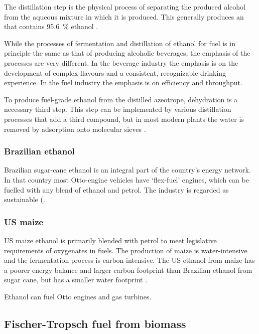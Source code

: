 The distillation step is the physical process of separating the produced alcohol
from the aqueous mixture in which it is produced. This generally produces an
 that contains \SI{95.6}{\percent} ethanol
\autocite{Kumar2010}.

While the processes of fermentation and distillation of ethanol for fuel is in
principle the same as that of producing alcoholic beverages, the emphasis of the
processes are very different. In the beverage industry the emphasis is on the
development of complex flavours and a consistent, recognizable drinking 
experience. In the fuel industry the emphasis is on efficiency and throughput.

To produce fuel-grade ethanol from the distilled azeotrope, dehydration is a
necessary third step. This step can be implemented by various distillation
processes that add a third compound, but in most modern plants the water is
removed by adsorption onto molecular sieves \autocite{Kumar2010}.

\subsubsection{Brazilian ethanol}

Brazilian sugar-cane ethanol is an integral part of the country's energy
network. In that country most Otto-engine vehicles have `flex-fuel' engines,
which can be fuelled with any blend of ethanol and petrol. The industry is
regarded as sustainable (\autocite{Smeets2006}.

\subsubsection{US maize}

US maize ethanol is primarily blended with petrol to meet legislative
requirements of oxygenates in fuels. The production of maize is water-intensive
and the fermentation process is carbon-intensive. The US ethanol from maize has
a poorer energy balance and larger carbon footprint than Brazilian ethanol from
sugar cane, but has a smaller water footprint \autocite{Mekonnen2018}.

Ethanol can fuel Otto engines and gas turbines. 

\subsection{Fischer-Tropsch fuel from biomass}
\label{sec:FT}

